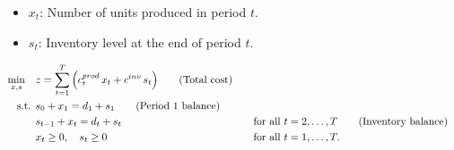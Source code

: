 \begin{itemize}
    \item \(x_t\): Number of units produced in period \(t\).
    \item \(s_t\): Inventory level at the end of period \(t\).
\end{itemize}

\begin{align*}
\min_{x,s} \quad & z = \sum_{t=1}^{T} \Big( c^{prod}_t\, x_t + c^{inv}\, s_t \Big)   \tag{Total cost} \\
\text{ s.t. }        & s_0 + x_1 = d_1 + s_1   \tag{Period 1 balance} \\
                 & s_{t-1} + x_t = d_t + s_t &&\quad \text{for all } t=2,\dots,T   \tag{Inventory balance} \\
                 & x_t \geq 0,\quad s_t \geq 0 &&\quad \text{for all } t=1,\dots,T.
\end{align*}


